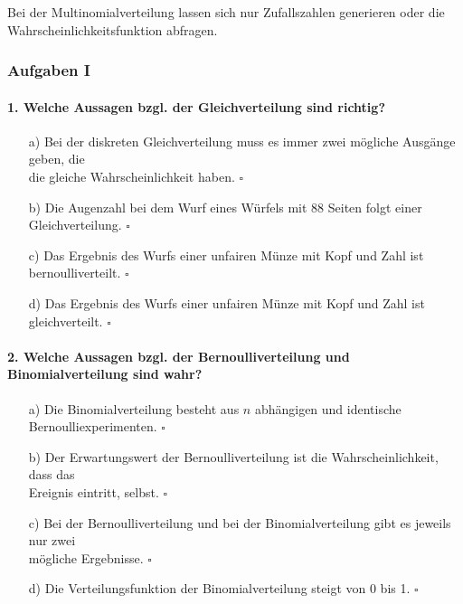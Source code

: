 \documentclass[a4paper]{article}
\newcommand\dangersign{%
 \makebox[1.8em][c]{%
 \makebox[0pt][c]{\raisebox{.15em}{\small!}}%
 \makebox[0pt][c]{\color{red}\Large$\triangle$}}}%
\begin{document}
\noindent \dangersign Bei der Multinomialverteilung lassen sich nur Zufallszahlen generieren oder die Wahrscheinlichkeitsfunktion abfragen.

\clearpage


\subsubsection{Aufgaben I}
\paragraph{1. Welche Aussagen bzgl. der Gleichverteilung sind richtig? }
\begin{itemize}
    \item[a)] Bei der diskreten Gleichverteilung muss es immer zwei mögliche Ausgänge geben, die\\ die gleiche Wahrscheinlichkeit haben. \hfill $\square$
    \item[b)] Die Augenzahl bei dem Wurf eines Würfels mit 88 Seiten folgt einer Gleichverteilung. \hfill $\square$
    \item[c)] Das Ergebnis des Wurfs einer unfairen Münze mit Kopf und Zahl ist bernoulliverteilt. \hfill $\square$
    \item[d)] Das Ergebnis des Wurfs einer unfairen Münze mit Kopf und Zahl ist gleichverteilt. \hfill $\square$
\end{itemize}

\paragraph{2. Welche Aussagen bzgl. der Bernoulliverteilung und Binomialverteilung sind wahr?}
\begin{itemize}
    \item[a)] Die Binomialverteilung besteht aus $n$ abhängigen und identische Bernoulliexperimenten. \hfill $\square$
    \item[b)] Der Erwartungswert der Bernoulliverteilung ist die Wahrscheinlichkeit, dass das\\ Ereignis eintritt, selbst. \hfill $\square$
    \item[c)] Bei der Bernoulliverteilung und bei der Binomialverteilung gibt es jeweils nur zwei\\ mögliche Ergebnisse. \hfill $\square$
    \item[d)] Die Verteilungsfunktion der Binomialverteilung steigt von 0 bis 1. \hfill $\square$
\end{itemize}
\end{document}
